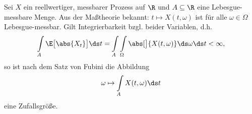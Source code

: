 \begin{bemerkungnr}\label{bemerkung2.1.10}
	Sei $X$ ein reellwertiger, messbarer Prozess auf $\R$ und $A\subseteq\R$ eine Lebesgue-messbare Menge.
	Aus der Maßtheorie bekannt:
	$t\mapsto X(t,\omega)$ ist für alle $\omega\in\Omega$ Lebesgue-messbar.
	Gilt Integrierbarkeit bzgl. beider Variablen, d.h.
	\begin{align*}
		\int\limits_A\E\big[\abs{X_t}\big]\ds t
		=\int\limits_A\int\limits_\Omega\abs[\big]{X(t,\omega)}\ds\omega\ds t<\infty,
	\end{align*}
	so ist nach dem Satz von Fubini die Abbildung
	\begin{align*}
		\omega\mapsto\int\limits_A X(t,\omega)\ds t
	\end{align*}
	eine Zufallsgröße.
\end{bemerkungnr}




